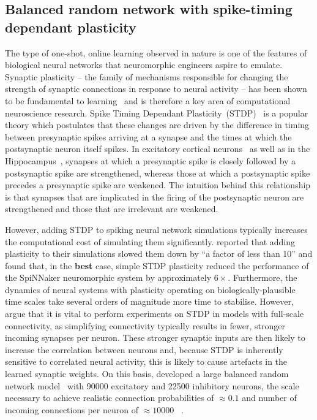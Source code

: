 \documentclass[utf8]{frontiersSCNS} %
\begin{document}
\subsection{Balanced random network with spike-timing dependant plasticity}
\label{sec:method/balanced_random}
The type of one-shot, online learning observed in nature is one of the features of biological neural networks that neuromorphic engineers aspire to emulate.
Synaptic plasticity -- the family of mechanisms responsible for changing the strength of synaptic connections in response to neural activity -- has been shown to be fundamental to learning~\citep{Nabavi2014} and is therefore a key area of computational neuroscience research.
Spike Timing Dependant Plasticity~(STDP)~\citep{Bi1998} is a popular theory which postulates that these changes are driven by the difference in timing between presynaptic spikes arriving at a synapse and the times at which the postsynaptic neuron itself spikes.
In excitatory cortical neurons~\citep{Markram1997} as well as in the Hippocampus~\citep{Bi1998}, synapses at which a presynaptic spike is closely followed by a postsynaptic spike are strengthened, whereas those at which a postsynaptic spike precedes a presynaptic spike are weakened.
The intuition behind this relationship is that synapses that are implicated in the firing of the postsynaptic neuron are strengthened and those that are irrelevant are weakened.

However, adding STDP to spiking neural network simulations typically increases the computational cost of simulating them significantly. 
\citet{Morrison2007} reported that adding plasticity to their simulations slowed them down by ``a factor of less than 10'' and \citet{Knight2016b} found that, in the \textbf{best} case, simple STDP plasticity reduced the performance of the SpiNNaker neuromorphic system by approximately $6\times$.
Furthermore, the dynamics of neural systems with plasticity operating on biologically-plausible time scales take several orders of magnitude more time to stabilise.
However, \citeauthor{Morrison2007} argue that it is vital to perform experiments on STDP in models with full-scale connectivity, as simplifying connectivity typically results in fewer, stronger incoming synapses per neuron.
These stronger synaptic inputs are then likely to increase the correlation between neurons and, because STDP is inherently sensitive to correlated neural activity, this is likely to cause artefacts in the learned synaptic weights.
On this basis, \citeauthor{Morrison2007} developed a large balanced random network model~\citep{Brunel2000} with \num{90000} excitatory and \num{22500} inhibitory neurons, the scale necessary to achieve realistic connection probabilities of $\approx 0.1$ and number of incoming connections per neuron of $\approx 10000$ ~\citep{braitenberg2013cortex}.
\end{document}

